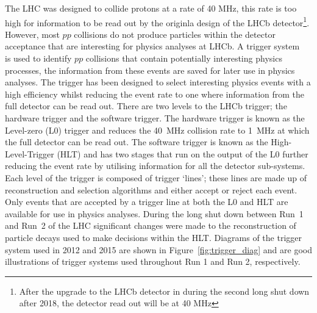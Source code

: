 The LHC was designed to collide protons at a rate of 40 MHz, this rate is too high for information to be read out by the originla design of the LHCb detector\footnote{After the upgrade to the LHCb detector in during the second long shut down after 2018, the detector read out will be at 40 MHz}. However, most $pp$ collisions do not produce particles within the detector acceptance that are interesting for physics analyses at LHCb. A trigger system~\cite{Alves:2008zz,Aaij:2012me,Albrecht:2013fba} is used to identify $pp$ collisions that contain potentially interesting physics processes, the information from these events are saved for later use in physics analyses. The trigger has been designed to select interesting physics events with a high efficiency whilst reducing the event rate to one where information from the full detector can be read out.  There are two levels to the LHCb trigger; the hardware trigger and the software trigger. The hardware trigger is known as the Level-zero (L0) trigger and reduces the 40~MHz collision rate to 1~MHz at which the full detector can be read out. The software trigger is known as the High-Level-Trigger (HLT) and has two stages that run on the output of the L0 further reducing the event rate by utilising information for all the detector sub-systems. Each level of the trigger is composed of trigger `lines'; these lines are made up of reconstruction and selection algorithms and either accept or reject each event. Only events that are accepted by a trigger line at both the L0 and HLT are available for use in physics analyses. 
During the long shut down between Run~1 and Run~2 of the LHC significant changes were made to the reconstruction of particle decays used to make decisions within the HLT. Diagrams of the trigger system used in 2012 and 2015 are shown in Figure~\ref{fig:trigger_diag} and are good illustrations of trigger systems used throughout Run 1 and Run 2, respectively.


